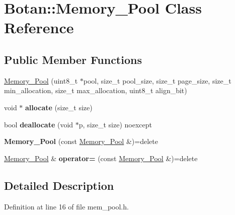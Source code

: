 \hypertarget{class_botan_1_1_memory___pool}{}\section{Botan\+:\+:Memory\+\_\+\+Pool Class Reference}
\label{class_botan_1_1_memory___pool}
\subsection*{Public Member Functions}
\begin{DoxyCompactItemize}
\item 
\mbox{\hyperlink{class_botan_1_1_memory___pool_a2960cd6fb9463c231c1c36f2d0e06897}{Memory\+\_\+\+Pool}} (uint8\+\_\+t $\ast$pool, size\+\_\+t pool\+\_\+size, size\+\_\+t page\+\_\+size, size\+\_\+t min\+\_\+allocation, size\+\_\+t max\+\_\+allocation, uint8\+\_\+t align\+\_\+bit)
\item 
\mbox{\label{class_botan_1_1_memory___pool_ad07caa00fcfb264974dd0a322d751132}} 
void $\ast$ {\bfseries allocate} (size\+\_\+t size)
\item 
\mbox{\label{class_botan_1_1_memory___pool_ac98f9abb1ec900a711680bfeb7eba2f6}} 
bool {\bfseries deallocate} (void $\ast$p, size\+\_\+t size) noexcept
\item 
\mbox{\label{class_botan_1_1_memory___pool_adc95ce8af605b479c17984d8e769c457}} 
{\bfseries Memory\+\_\+\+Pool} (const \mbox{\hyperlink{class_botan_1_1_memory___pool}{Memory\+\_\+\+Pool}} \&)=delete
\item 
\mbox{\label{class_botan_1_1_memory___pool_a77f691473f0aa88b5ca76bf053d94645}} 
\mbox{\hyperlink{class_botan_1_1_memory___pool}{Memory\+\_\+\+Pool}} \& {\bfseries operator=} (const \mbox{\hyperlink{class_botan_1_1_memory___pool}{Memory\+\_\+\+Pool}} \&)=delete
\end{DoxyCompactItemize}


\subsection{Detailed Description}


Definition at line 16 of file mem\+\_\+pool.\+h.



